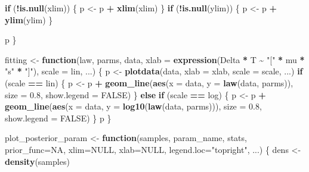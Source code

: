 \documentclass[
]{article}
\newenvironment{Shaded}{\begin{snugshade}}{\end{snugshade}}
\newcommand{\AttributeTok}[1]{\textcolor[rgb]{0.13,0.29,0.53}{#1}}
\newcommand{\ConstantTok}[1]{\textcolor[rgb]{0.56,0.35,0.01}{#1}}
\newcommand{\ControlFlowTok}[1]{\textcolor[rgb]{0.13,0.29,0.53}{\textbf{#1}}}
\newcommand{\FloatTok}[1]{\textcolor[rgb]{0.00,0.00,0.81}{#1}}
\newcommand{\FunctionTok}[1]{\textcolor[rgb]{0.13,0.29,0.53}{\textbf{#1}}}
\newcommand{\NormalTok}[1]{#1}
\newcommand{\OtherTok}[1]{\textcolor[rgb]{0.56,0.35,0.01}{#1}}
\newcommand{\SpecialCharTok}[1]{\textcolor[rgb]{0.81,0.36,0.00}{\textbf{#1}}}
\newcommand{\StringTok}[1]{\textcolor[rgb]{0.31,0.60,0.02}{#1}}
\begin{document}
\begin{Shaded}
\begin{Highlighting}[]
  \ControlFlowTok{if}\NormalTok{ (}\SpecialCharTok{!}\FunctionTok{is.null}\NormalTok{(xlim)) \{}
\NormalTok{    p }\OtherTok{\textless{}{-}}\NormalTok{ p }\SpecialCharTok{+} \FunctionTok{xlim}\NormalTok{(xlim)}
\NormalTok{  \}}
  \ControlFlowTok{if}\NormalTok{ (}\SpecialCharTok{!}\FunctionTok{is.null}\NormalTok{(ylim)) \{}
\NormalTok{    p }\OtherTok{\textless{}{-}}\NormalTok{ p }\SpecialCharTok{+} \FunctionTok{ylim}\NormalTok{(ylim)}
\NormalTok{  \}}

\NormalTok{  p}
\NormalTok{\}}

\NormalTok{fitting }\OtherTok{\textless{}{-}} \ControlFlowTok{function}\NormalTok{(law, parms, data, }\AttributeTok{xlab =} \FunctionTok{expression}\NormalTok{(Delta }\SpecialCharTok{*}\NormalTok{ T }\SpecialCharTok{\textasciitilde{}} \StringTok{"["} \SpecialCharTok{*}\NormalTok{ mu }\SpecialCharTok{*} \StringTok{"s"} \SpecialCharTok{*} \StringTok{"]"}\NormalTok{), }\AttributeTok{scale =} \StringTok{\textquotesingle{}lin\textquotesingle{}}\NormalTok{, ...) \{}
\NormalTok{  p }\OtherTok{\textless{}{-}} \FunctionTok{plotdata}\NormalTok{(data, }\AttributeTok{xlab =}\NormalTok{ xlab, }\AttributeTok{scale =}\NormalTok{ scale, ...)}
  \ControlFlowTok{if}\NormalTok{ (scale }\SpecialCharTok{==} \StringTok{\textquotesingle{}lin\textquotesingle{}}\NormalTok{) \{}
\NormalTok{    p }\OtherTok{\textless{}{-}}\NormalTok{ p }\SpecialCharTok{+} \FunctionTok{geom\_line}\NormalTok{(}\FunctionTok{aes}\NormalTok{(}\AttributeTok{x =}\NormalTok{ data, }\AttributeTok{y =} \FunctionTok{law}\NormalTok{(data, parms)), }\AttributeTok{size =} \FloatTok{0.8}\NormalTok{, }\AttributeTok{show.legend =} \ConstantTok{FALSE}\NormalTok{)}
\NormalTok{  \} }\ControlFlowTok{else} \ControlFlowTok{if}\NormalTok{ (scale }\SpecialCharTok{==} \StringTok{\textquotesingle{}log\textquotesingle{}}\NormalTok{) \{}
\NormalTok{    p }\OtherTok{\textless{}{-}}\NormalTok{ p }\SpecialCharTok{+} \FunctionTok{geom\_line}\NormalTok{(}\FunctionTok{aes}\NormalTok{(}\AttributeTok{x =}\NormalTok{ data, }\AttributeTok{y =} \FunctionTok{log10}\NormalTok{(}\FunctionTok{law}\NormalTok{(data, parms))), }\AttributeTok{size =} \FloatTok{0.8}\NormalTok{, }\AttributeTok{show.legend =} \ConstantTok{FALSE}\NormalTok{)}
\NormalTok{  \}}
\NormalTok{  p}
\NormalTok{\}}

\NormalTok{plot\_posterior\_param }\OtherTok{\textless{}{-}} \ControlFlowTok{function}\NormalTok{(samples, param\_name, stats, }\AttributeTok{prior\_func=}\ConstantTok{NA}\NormalTok{, }\AttributeTok{xlim=}\ConstantTok{NULL}\NormalTok{, }\AttributeTok{xlab=}\ConstantTok{NULL}\NormalTok{,  }\AttributeTok{legend.loc=}\StringTok{"topright"}\NormalTok{, ...) \{}
\NormalTok{  dens }\OtherTok{\textless{}{-}} \FunctionTok{density}\NormalTok{(samples)}
  

\end{Highlighting}
\end{Shaded}
\end{document}

